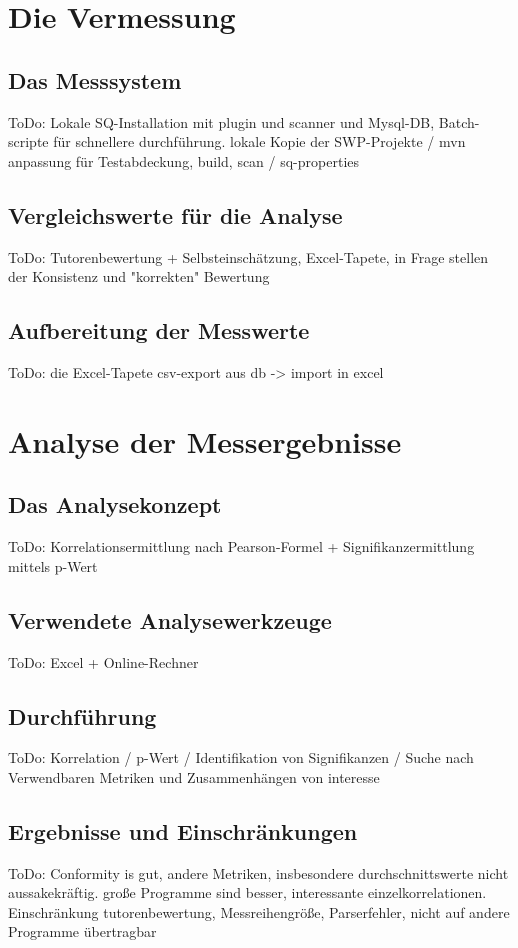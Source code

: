 \documentclass[da,ngerman]{stthesis}
\begin{document}
  	\chapter{Die Vermessung}
  		\section{Das Messsystem}
  			ToDo: Lokale SQ-Installation mit plugin und scanner und Mysql-DB, Batch-scripte für schnellere durchführung. lokale Kopie der SWP-Projekte / mvn anpassung für Testabdeckung, build, scan / sq-properties
  		\section{Vergleichswerte für die Analyse}
  			ToDo: Tutorenbewertung + Selbsteinschätzung, Excel-Tapete, in Frage stellen der Konsistenz und "korrekten" Bewertung
  		\section{Aufbereitung der Messwerte}
  			ToDo: die Excel-Tapete csv-export aus db -> import in excel
  		
  	\chapter{Analyse der Messergebnisse}
  		\section{Das Analysekonzept}
  			ToDo: Korrelationsermittlung nach Pearson-Formel + Signifikanzermittlung mittels p-Wert
  		\section{Verwendete Analysewerkzeuge}
  			ToDo: Excel + Online-Rechner
  		\section{Durchführung}
  			ToDo: Korrelation / p-Wert / Identifikation von Signifikanzen / Suche nach Verwendbaren Metriken und Zusammenhängen von interesse
  		\section{Ergebnisse und Einschränkungen} \label{Analyseergebnis}
  			ToDo: Conformity is gut, andere Metriken, insbesondere durchschnittswerte nicht aussakekräftig. große Programme sind besser, interessante einzelkorrelationen. Einschränkung tutorenbewertung, Messreihengröße, Parserfehler, nicht auf andere Programme übertragbar 
\end{document}

